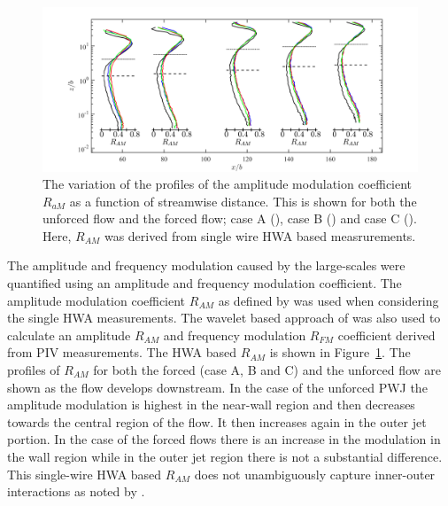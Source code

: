 \begin{figure}[h!]
	\centering
	\includegraphics[width=.99\textwidth]{pics/R_AM.png}
	\caption{The variation of the profiles of the amplitude modulation coefficient $R_{aM}$ as a function of streamwise distance. This is shown for both the unforced flow and the forced flow; case A (\textcolor{blue}{\full}), case B (\textcolor{red}{\full}) and case C (\textcolor{green}{\full}). Here, $R_{AM}$ was derived from single wire HWA based measrurements.}
	\label{fg:RAM}
\end{figure}



The amplitude and frequency modulation caused by the large-scales were quantified using an amplitude and frequency modulation coefficient. The amplitude modulation coefficient $R_{AM}$ as defined by \citet{Mathis2009a} was used when considering the single HWA measurements. The wavelet based approach of \citet{Baars2015a} was also used to calculate an amplitude $R_{AM}$ and frequency modulation $R_{FM}$ coefficient derived from PIV measurements. The HWA based $R_{AM}$ is shown in Figure~\ref{fg:RAM}. The profiles of $R_{AM}$ for both the forced (case A, B and C) and the unforced flow are shown as the flow develops downstream. In the case of the unforced PWJ the amplitude modulation is highest in the near-wall region and then decreases towards the central region of the flow. It then increases again in the outer jet portion. In the case of the forced flows there is an increase in the modulation in the wall region while in the outer jet region there is not a substantial difference. This single-wire HWA based $R_{AM}$ does not unambiguously capture inner-outer interactions as noted by \citet{Schlatter2010a}.

